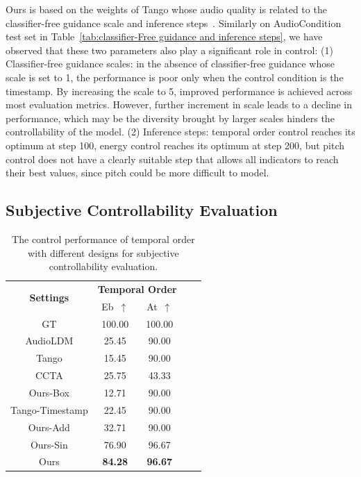\documentclass[letterpaper]{article} %
\begin{document}
Ours is based on the weights of Tango whose audio quality is related to the classifier-free guidance scale and inference steps~\cite{ghosal2023tango}. Similarly on AudioCondition test set in Table~\ref{tab:classifier-Free guidance and inference steps}, we have observed that these two parameters also play a significant role in control: (1) Classifier-free guidance scales: in the absence of classifier-free guidance whose scale is set to 1, the performance is poor only when the control condition is the timestamp. By increasing the scale to 5, improved performance is achieved across most evaluation metrics. However, further increment in scale leads to a decline in performance, which may be the diversity brought by larger scales hinders the controllability of the model. (2) Inference steps: temporal order control reaches its optimum at step 100, energy control reaches its optimum at step 200, but pitch control does not have a clearly suitable step that allows all indicators to reach their best values, since pitch could be more difficult to model.

\subsection{Subjective Controllability Evaluation}


\begin{table}[!h]\footnotesize
    \centering
    \caption{The control performance of temporal order with different designs for subjective controllability evaluation.}
    \label{tab:subjective controllability evaluation}
        \begin{tabular}{c|cccc}
        \toprule
        \multirow{2}{*}{\textbf{Settings}} & \multicolumn{2}{c}{\textbf{Temporal Order}} \\
         & Eb~$\uparrow$ & At~$\uparrow$  \\
        \midrule
        \midrule
         GT & 100.00 & 100.00\\
         \midrule
         AudioLDM & 25.45 & 90.00 \\
         Tango & 15.45 & 90.00 \\
         CCTA & 25.75 & 43.33 \\
         Ours-Box & 12.71 & 90.00 \\
         Tango-Timestamp & 22.45 & 90.00 \\
         Ours-Add & 32.71 & 90.00 \\
         Ours-Sin & 76.90 & 96.67 \\
         Ours & \textbf{84.28} & \textbf{96.67} \\
        \bottomrule
        \end{tabular}
\end{table}
\end{document}
